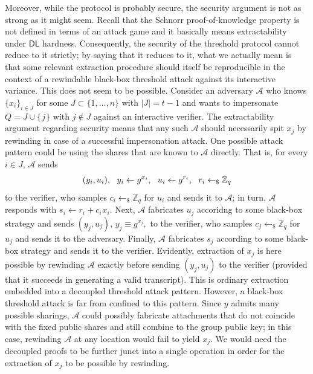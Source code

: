 \documentclass{iacrtrans}
\begin{document}
Moreover, while the protocol is probably secure,
the security argument is not as strong
as it might seem. Recall that the Schnorr proof-of-knowledge
property is not defined in terms of an attack game
and it basically means extractability under $\mathsf{DL}$
hardness. Consequently, the security of the threshold protocol
cannot reduce to it strictly;
by saying that it reduces to it,
what we actually mean is that
some relevant extraction procedure
should itself be reproducible in the context of
a rewindable black-box threshold attack
against its interactive variance.
This does not seem to be possible.
Consider an adversary $\mathcal{A}$ who knows
$\{x_i\}_{i \in J}$
for some $J \subset \{1, \dots, n\}$ with $|J| = t - 1$
and wants to impersonate
$Q = J \cup \{\hspace{1pt}j\hspace{1pt}\}$
with $j \not \in J$ against an interactive verifier.
The extractability argument regarding security
means that any such $\mathcal{A}$
should necessarily spit $x_j$ by rewinding in case of
a successful impersonation attack.
One possible attack pattern could
be using the shares that are known to $\mathcal{A}$ directly.
That is, for every $i \in J$,
$\mathcal{A}$ sends
\vspace{5pt}
\begin{equation*}
(y_i, u_i),
\ \ y_i \leftarrow g ^ {x_i},
\ \ u_i \leftarrow g ^ {r_i},
\ \ r_i \leftarrow_\$ \mathbb{Z}_q
\vspace{5pt}
\end{equation*}
to the verifier,
who samples $c_i \leftarrow_\$ \mathbb{Z}_q$
for $u_i$
and sends it to $\mathcal{A}$;
in turn, $\mathcal{A}$ responds
with $s_i \leftarrow r_i + c_i\hspace{1pt}x_i$.
Next, $\mathcal{A}$ fabricates $u_j$
accoridng to some black-box strategy and sends
$(y_j, u_j),\hspace{2pt} y_j \equiv g ^ {x_j},$ to the verifier,
who samples $c_j \leftarrow_\$ \mathbb{Z}_q$ for $u_j$
and sends it to the adversary.
Finally, $\mathcal{A}$ fabricates $s_j$
according to some black-box strategy
and sends it to the verifier.
Evidently, extraction of $x_j$ is here possible
by rewinding $\mathcal{A}$
exactly before sending $(y_j, u_j)$ to the verifier
(provided that it
succeeds in generating a valid transcript).
This is ordinary extraction
embedded into a decoupled threshold attack pattern.
However, a black-box threshold attack
is far from confined to this pattern.
Since $y$ admits many possible sharings,
$\mathcal{A}$ could possibly fabricate attachments
that do not coincide with the fixed public shares
and still combine to the group public key;
in this case, rewinding $\mathcal{A}$ at any location
would fail to yield $x_j$.
We would need the decoupled proofs to
be further junct into a single operation
in order for the extraction of $x_j$
to be possible by rewinding.
\end{document}
